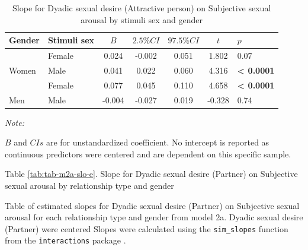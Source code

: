 \documentclass[
  bookmarksnumbered]{article}
\begin{document}
\begin{table}[H]

\caption{\label{tab:tab-m2a-slo-d}Slope for Dyadic sexual desire (Attractive person) on 
        Subjective sexual arousal by stimuli sex and gender}
\centering
\begin{threeparttable}
\begin{tabular}[t]{llccccl}
\toprule
Gender & Stimuli sex & $B$ & $2.5\% CI$ & $97.5\% CI$ & $t$ & $p$\\
\midrule
 & Female & 0.024 & -0.002 & 0.051 & 1.802 & 0.07\\
\cmidrule{2-7}
\multirow{-2}{*}{\raggedright\arraybackslash Women} & Male & 0.041 & 0.022 & 0.060 & 4.316 & \textbf{< 0.0001}\\
\cmidrule{1-7}
 & Female & 0.077 & 0.045 & 0.110 & 4.658 & \textbf{< 0.0001}\\
\cmidrule{2-7}
\multirow{-2}{*}{\raggedright\arraybackslash Men} & Male & -0.004 & -0.027 & 0.019 & -0.328 & 0.74\\
\bottomrule
\end{tabular}
\begin{tablenotes}[para]
\item \textit{Note: } 
\item $B$ and $CIs$ are for unstandardized coefficient.
           No intercept is reported as continuous predictors were centered
           and are dependent on this specific sample.
\end{tablenotes}
\end{threeparttable}
\end{table}

Table \ref{tab:tab-m2a-slo-e}. Slope for Dyadic sexual desire (Partner) on Subjective sexual arousal by relationship type and gender

Table of estimated slopes for Dyadic sexual desire (Partner) on Subjective sexual arousal for each relationship type and gender from model 2a. Dyadic sexual desire (Partner) were centered Slopes were calculated using the \texttt{sim\_slopes} function from the \texttt{interactions} package \autocite{interactionscit}.
\end{document}
